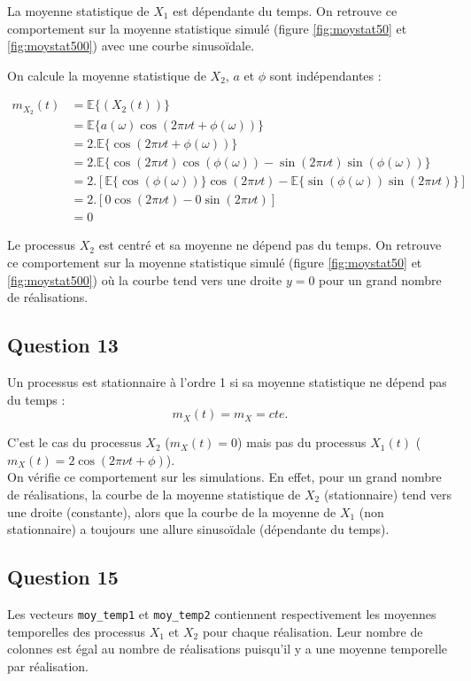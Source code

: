 \documentclass{article}
\begin{document}
\noindent
La moyenne statistique de $X_1$ est dépendante du temps. On retrouve ce comportement sur la moyenne statistique simulé (figure \ref{fig:moystat50} et \ref{fig:moystat500}) avec une courbe sinusoïdale.

\noindent
On calcule la moyenne statistique de $X_2$, $a$ et $\phi$ sont indépendantes :

\begin{equation}
\begin{aligned}
m_{X_2}(t)
& = \mathbb{E}\{(X_2(t))\} \\
& = \mathbb{E}\{a(\omega)\cos(2\pi\nu t+\phi(\omega))\} \\
& = 2.\mathbb{E}\{\cos(2\pi\nu t+\phi(\omega))\} \\
& = 2.\mathbb{E}\{\cos(2\pi\nu t)\cos(\phi(\omega)) - \sin(2\pi\nu t)\sin(\phi(\omega))\} \\
& = 2.[\mathbb{E}\{\cos(\phi(\omega))\}\cos(2\pi\nu t) - \mathbb{E}\{\sin(\phi(\omega))\sin(2\pi\nu t)\}] \\
& = 2.[0\cos(2\pi\nu t) - 0\sin(2\pi\nu t)] \\
& = 0
\end{aligned}
\end{equation}

\noindent
Le processus $X_2$ est centré et sa moyenne ne dépend pas du temps. On retrouve ce comportement sur la moyenne statistique simulé (figure \ref{fig:moystat50} et \ref{fig:moystat500}) où la courbe tend vers une droite $y = 0$ pour un grand nombre de réalisations.

\subsection*{Question 13}
Un processus est stationnaire à l'ordre 1 si sa moyenne statistique ne dépend pas du temps : 
\begin{equation*}
m_X(t) = m_X = \mathit{cte.}
\end{equation*}

\noindent
C'est le cas du processus $X_2$ ($m_X(t) = 0$) mais pas du processus $X_1(t)$ ($m_X(t) = 2\cos(2\pi\nu t+\phi)$). \\
On vérifie ce comportement sur les simulations. En effet, pour un grand nombre de réalisations, la courbe de la moyenne statistique de $X_2$ (stationnaire) tend vers une droite (constante), alors que la courbe de la moyenne de $X_1$ (non stationnaire) a toujours une allure sinusoïdale (dépendante du temps).

\subsection*{Question 15}
Les vecteurs \texttt{moy\_temp1} et \texttt{moy\_temp2} contiennent respectivement les moyennes temporelles des processus $X_1$ et $X_2$ pour chaque réalisation. Leur nombre de colonnes est égal au nombre de réalisations puisqu'il y a une moyenne temporelle par réalisation.
\end{document}

